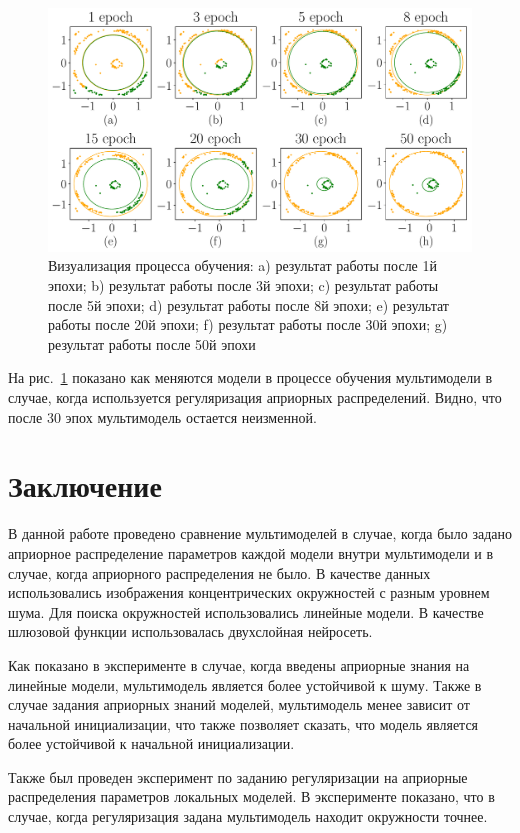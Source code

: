 \documentclass[12pt, twoside]{article}
\numberwithin{equation}{section}
\begin{document}
\begin{figure}[h!t]\center
\includegraphics[width=1\textwidth]{result/experiment_real_progress}
\caption{Визуализация процесса обучения: a) результат работы после 1й эпохи; b) результат работы после 3й эпохи; c) результат работы после 5й эпохи; d) результат работы после 8й эпохи; e) результат работы после 20й эпохи; f) результат работы после 30й эпохи; g) результат работы после 50й эпохи}
\label{experiment:4}
\end{figure}

На рис.~\ref{experiment:4} показано как меняются модели в процессе обучения мультимодели в случае, когда используется регуляризация априорных распределений. Видно, что после 30 эпох мультимодель остается неизменной.

\section{Заключение}
В данной работе проведено сравнение мультимоделей в случае, когда было задано априорное распределение параметров каждой модели внутри мультимодели и в случае, когда априорного распределения не было. В качестве данных использовались изображения концентрических окружностей с разным уровнем шума. Для поиска окружностей использовались линейные модели. В качестве шлюзовой функции использовалась двухслойная нейросеть.

Как показано в эксперименте в случае, когда введены априорные знания на линейные модели, мультимодель является более устойчивой к шуму. Также в случае задания априорных знаний моделей, мультимодель менее зависит от начальной инициализации, что также позволяет сказать, что модель является более устойчивой к начальной инициализации.

Также был проведен эксперимент по заданию регуляризации на априорные распределения параметров локальных моделей. В эксперименте показано, что в случае, когда регуляризация задана мультимодель находит окружности точнее.
\end{document}
